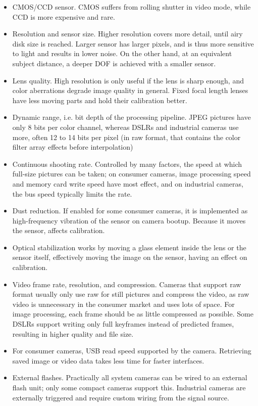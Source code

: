 \begin{itemize}
\item CMOS/CCD sensor. CMOS suffers from rolling shutter in video mode, while CCD is more expensive and rare.
\item Resolution and sensor size. Higher resolution covers more detail, until airy disk size is reached. Larger sensor has larger pixels, and is thus more sensitive to light and results in lower noise. On the other hand, at an equivalent subject distance, a deeper DOF is achieved with a smaller sensor.
\item Lens quality. High resolution is only useful if the lens is sharp enough, and color aberrations degrade image quality in general. Fixed focal length lenses have less moving parts and hold their calibration better.
\item Dynamic range, i.e. bit depth of the processing pipeline. JPEG pictures have only 8 bits per color channel, whereas DSLRs and industrial cameras use more, often 12 to 14 bits per pixel (in raw format, that contains the color filter array effects before interpolation)
\item Continuous shooting rate. Controlled by many factors, the speed at which full-size pictures can be taken; on consumer cameras, image processing speed and memory card write speed have most effect, and on industrial cameras, the bus speed typically limits the rate.
\item Dust reduction. If enabled for some consumer cameras, it is implemented as high-frequency vibration of the sensor on camera bootup. Because it moves the sensor, affects calibration.
\item Optical stabilization works by moving a glass element inside the lens or the sensor itself, effectively moving the image on the sensor, having an effect on calibration.
\item Video frame rate, resolution, and compression. Cameras that support raw format usually only use raw for still pictures and compress the video, as raw video is unnecessary in the consumer market and uses lots of space. For image processing, each frame should be as little compressed as possible. Some DSLRs support writing only full keyframes instead of predicted frames, resulting in higher quality and file size.
\item For consumer cameras, USB read speed supported by the camera. Retrieving saved image or video data takes less time for faster interfaces.
\item External flashes. Practically all system cameras can be wired to an external flash unit; only some compact cameras support this. Industrial cameras are externally triggered and require custom wiring from the signal source.

\end{itemize}
